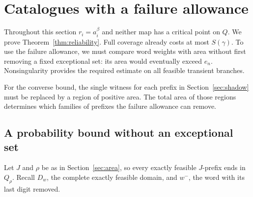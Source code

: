 \documentclass[11pt]{amsart}
\theoremstyle{definition}
\theoremstyle{remark}
\numberwithin{equation}{section}
\begin{document}
\section{Catalogues with a failure allowance}
\label{sec:reliability}
Throughout this section $r_i=a_i^\beta$ and neither map has a
critical point on $Q$. We prove Theorem~\ref{thm:reliability}.
Full coverage already costs at most $S(\gamma)$. To use the failure
allowance, we must compare word weights with area without first
removing a fixed exceptional set: its area would eventually exceed
$e_n$. Nonsingularity provides the required estimate on all feasible
transient branches.

For the converse bound, the single witness for each prefix in
Section~\ref{sec:shadow} must be replaced by a region of positive
area. The total area of those regions determines which families
of prefixes the failure allowance can remove.

\subsection{A probability bound without an exceptional set}
Let $J$ and $\rho$ be as in Section~\ref{sec:area}, so every
exactly feasible $J$-prefix ends in $Q_\rho$.
Recall $D_w$, the complete exactly feasible domain, and $w^-$,
the word with its last digit removed.
\end{document}
